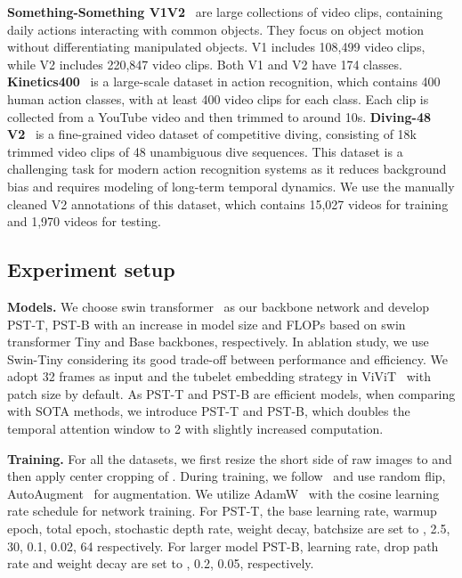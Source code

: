 \documentclass[runningheads]{llncs}
\begin{document}
	\textbf{Something-Something V1V2}~\cite{goyal2017something} are large collections of video clips, containing daily actions interacting with common objects. They focus on object motion without differentiating manipulated objects. V1 includes 108,499 video clips, while V2 includes 220,847 video clips. Both V1 and V2 have 174 classes. \textbf{Kinetics400}~\cite{kay2017kinetics} is a large-scale dataset in action recognition, which contains 400 human action classes, with at least 400 video clips for each class. Each clip is collected from a YouTube video and then trimmed to around 10s. \textbf{Diving-48 V2}~\cite{li2018resound} is a fine-grained video dataset of competitive diving, consisting of 18k trimmed video clips of 48 unambiguous dive sequences. This dataset is a challenging task for modern action recognition systems as it reduces background bias and requires modeling of long-term temporal dynamics.  We use the manually cleaned V2 annotations of this dataset, which contains 15,027 videos for training and 1,970 videos for testing.
	
	
	
	
	\subsection{Experiment setup}
	
	\textbf{Models.} We choose swin transformer~\cite{liu2021swin} as our backbone network and develop PST-T, PST-B with an increase in model size and FLOPs based on swin transformer Tiny and Base backbones, respectively. In ablation study, we use Swin-Tiny considering its good trade-off between performance and efficiency. 
	We adopt 32 frames as input and the tubelet embedding strategy in ViViT~\cite{AnuragArnab2021ViViTAV} with patch size  by default. As PST-T and PST-B are efficient models, when comparing with SOTA methods, we introduce PST-T and PST-B, which doubles the temporal attention window to 2 with slightly increased computation.
	
	
	\textbf{Training.} For all the datasets, we first resize the short side of raw images to  and then apply center cropping of . During training, we follow~\cite{ZeLiu2021VideoST} and use random flip,  AutoAugment~\cite{autoaugment} for augmentation. We utilize AdamW~\cite{LoshchilovH19} with the cosine learning rate schedule for network training. For PST-T, the base learning rate, warmup epoch, total epoch, stochastic depth rate, weight decay, batchsize are set to , 2.5, 30, 0.1, 0.02, 64 respectively. For larger model PST-B, learning rate, drop path rate and weight decay are set to , 0.2, 0.05, respectively. 
	
\end{document}
